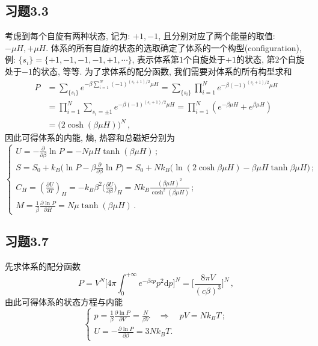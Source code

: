 \documentclass[letterpaper, 10pt]{article}
\newcommand{\dd}{\mathrm{d}}
\begin{document}
\subsection{习题3.3}
考虑到每个自旋有两种状态, 记为: $+1, -1$, 且分别对应了两个能量的取值: $-\mu H, +\mu H$. 体系的所有自旋的状态的选取确定了体系的一个构型(configuration), 例: 
$\{s_{i}\} = \{+1, -1, -1, -1, +1, \cdots\}$, 表示体系第$1$个自旋处于$+1$的状态, 第$2$个自旋处于$-1$的状态, 等等. 为了求体系的配分函数, 我们需要对体系的所有构型求和
\begin{align*}
P & = \sum_{\{s_{i}\}} e^{-\beta \sum_{i=1}^{N} (-1)^{(s_{i}+1)/2} \mu H} = \sum_{\{s_{i}\}} \prod_{i=1}^{N} e^{-\beta (-1)^{(s_{i}+1)/2} \mu H} \\
& = \prod_{i=1}^{N} \sum_{s_{i}=\pm1} e^{-\beta (-1)^{(s_{i}+1)/2} \mu H} = \prod_{i=1}^{N} \left( e^{-\beta \mu H} + e^{\beta \mu H} \right) \\
& = \big(2 \cosh (\beta \mu H)\big)^{N} \,,
\end{align*}
因此可得体系的内能, 熵, 热容和总磁矩分别为
\[\begin{cases}
U = -\frac{\partial}{\partial \beta} \ln P = -N \mu H \tanh(\beta \mu H)\,;\\
S = S_{0} + k_{B} \big( \ln P - \beta \frac{\partial}{\partial \beta} \ln P \big) = S_{0} + Nk_{B} \big( \ln (2\cosh \beta \mu H) - \beta \mu H \tanh \beta \mu H \big)\,;\\
C_{H} = \left( \frac{\partial U}{\partial T} \right)_{H} = - k_{B} \beta^2 \big( \frac{\partial U}{\partial \beta} \big)_{H} 
= N k_{B} \frac{(\beta \mu H)^2}{\cosh^2(\beta \mu H)}\,;\\
M = \frac{1}{\beta} \frac{\partial \ln P}{\partial H} = N \mu \tanh(\beta \mu H)\,.
\end{cases}\]

\subsection{习题3.7}
先求体系的配分函数
\[ P = V^{N} \bigg[ 4\pi \int_{0}^{+\infty} e^{-\beta c p} p^2 \dd p \bigg]^{N}  = \bigg[ \frac{8\pi V}{(c\beta)^3} \bigg]^{N}\,, \]
由此可得体系的状态方程与内能
\[\begin{cases}
p = \frac{1}{\beta} \frac{\partial \ln P}{\partial V} = \frac{N}{\beta V} \quad{} \Rightarrow \quad{} pV = Nk_{B}T\,;\\
U = -\frac{\partial \ln P}{\partial \beta} = 3Nk_{B}T.
\end{cases}\]
\end{document}
